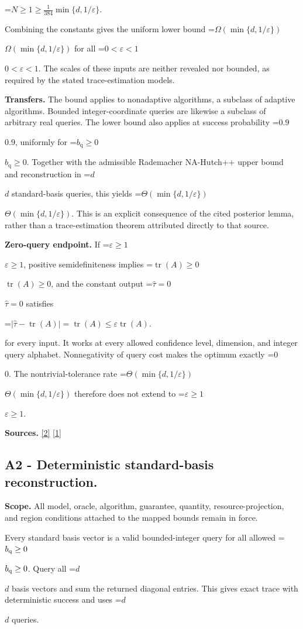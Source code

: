\documentclass[10pt,a4paper]{article}
\newcommand{\AtlasMath}[1]{\par\begingroup\centering\setbox0=\hbox{$\displaystyle #1$}\ifdim\wd0>1.4\linewidth\typeout{ATLAS WIDE FORMULA: \the\wd0}\fi\ifdim\wd0>\linewidth\resizebox{\linewidth}{!}{\box0}\else\box0\fi\par\endgroup}
\newcommand{\AtlasInlineMath}[1]{\begingroup\setbox0=\hbox{$#1$}\ifdim\wd0>.4\linewidth\endgroup\AtlasMath{#1}\else\endgroup$#1$\fi}
\begin{document}
\AtlasMath{N\ge1\ge\frac1{384}\min\{d,1/\varepsilon\}.}

Combining the constants gives the uniform lower bound \AtlasInlineMath{\Omega(\min\{d,1/\varepsilon\})} for all \AtlasInlineMath{0<\varepsilon<1}. The scales of these inputs are neither revealed nor bounded, as required by the stated trace-estimation models.

\textbf{Transfers.} The bound applies to nonadaptive algorithms, a subclass of adaptive algorithms. Bounded integer-coordinate queries are likewise a subclass of arbitrary real queries. The lower bound also applies at success probability \AtlasInlineMath{0.9}, uniformly for \AtlasInlineMath{b_{\mathrm q}\ge0}. Together with the admissible Rademacher NA-Hutch++ upper bound and reconstruction in \AtlasInlineMath{d} standard-basis queries, this yields \AtlasInlineMath{\Theta(\min\{d,1/\varepsilon\})}. This is an explicit consequence of the cited posterior lemma, rather than a trace-estimation theorem attributed directly to that source.

\textbf{Zero-query endpoint.} If \AtlasInlineMath{\varepsilon\ge1}, positive semidefiniteness implies \AtlasInlineMath{\operatorname{tr}(A)\ge0}, and the constant output \AtlasInlineMath{\widehat\tau=0} satisfies

\AtlasMath{|\widehat\tau-\operatorname{tr}(A)|=\operatorname{tr}(A)\le\varepsilon\operatorname{tr}(A).}

for every input. It works at every allowed confidence level, dimension, and integer query alphabet. Nonnegativity of query cost makes the optimum exactly \AtlasInlineMath{0}. The nontrivial-tolerance rate \AtlasInlineMath{\Theta(\min\{d,1/\varepsilon\})} therefore does not extend to \AtlasInlineMath{\varepsilon\ge1}.

\textbf{Sources.} \href{https://arxiv.org/pdf/2402.09379v3}{[2]} \href{https://proceedings.mlr.press/v125/braverman20a/braverman20a.pdf}{[1]}

\subsection{A2 - Deterministic standard-basis reconstruction.}
\textbf{Scope.} All model, oracle, algorithm, guarantee, quantity, resource-projection, and region conditions attached to the mapped bounds remain in force.

Every standard basis vector is a valid bounded-integer query for all allowed \AtlasInlineMath{b_{\rm q}\ge0}. Query all \AtlasInlineMath{d} basis vectors and sum the returned diagonal entries. This gives exact trace with deterministic success and uses \AtlasInlineMath{d} queries.
\end{document}

